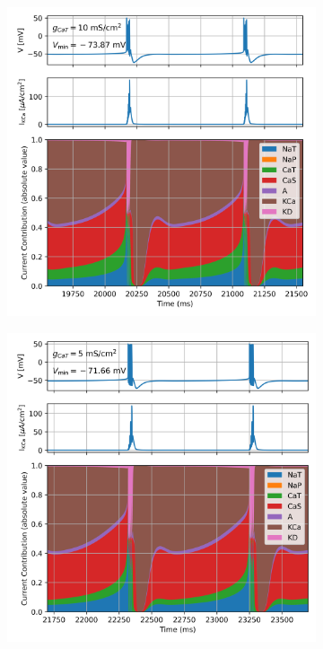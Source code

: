 \documentclass[../main.tex]{subfiles}
\begin{document}
{\begin{figure}[!t]
    \begin{subfigure}[t]{0.48\textwidth}
        \centering
        \includegraphics[width=\linewidth]{../img/rmp/goldman_2_g_10.png}
        \label{fig:rmp_models_contrib_10_goldman_2}
    \end{subfigure}
    \hfill
    \begin{subfigure}[t]{0.48\textwidth}
        \centering
        \includegraphics[width=\linewidth]{../img/rmp/goldman_2_g_5.png}
        \label{fig:rmp_models_contrib_5_goldman_2}
    \end{subfigure}
    

\end{figure}}
\end{document}
